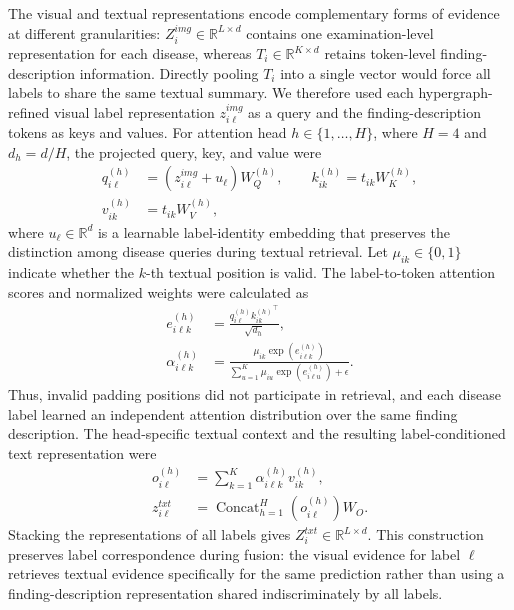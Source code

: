 \documentclass[Afour,sagev,times]{sagej}
\begin{document}
The visual and textual representations encode complementary forms of evidence at different granularities: $Z_i^{img}\in\mathbb{R}^{L\times d}$ contains one examination-level representation for each disease, whereas $T_i\in\mathbb{R}^{K\times d}$ retains token-level finding-description information. Directly pooling $T_i$ into a single vector would force all labels to share the same textual summary. We therefore used each hypergraph-refined visual label representation $z_{i\ell}^{img}$ as a query and the finding-description tokens as keys and values. For attention head $h\in\{1,\ldots,H\}$, where $H=4$ and $d_h=d/H$, the projected query, key, and value were
\begin{equation}
\begin{aligned}
q_{i\ell}^{(h)}&=(z_{i\ell}^{img}+u_{\ell})W_Q^{(h)},\qquad
k_{ik}^{(h)}=t_{ik}W_K^{(h)},\\
v_{ik}^{(h)}&=t_{ik}W_V^{(h)},
\end{aligned}
\end{equation}
where $u_{\ell}\in\mathbb{R}^{d}$ is a learnable label-identity embedding that preserves the distinction among disease queries during textual retrieval.
Let $\mu_{ik}\in\{0,1\}$ indicate whether the $k$-th textual position is valid. The label-to-token attention scores and normalized weights were calculated as
\begin{equation}
\begin{aligned}
e_{i\ell k}^{(h)}&=\frac{q_{i\ell}^{(h)}{k_{ik}^{(h)}}^{\top}}{\sqrt{d_h}},\\
\alpha_{i\ell k}^{(h)}&=
\frac{\mu_{ik}\exp(e_{i\ell k}^{(h)})}
{\sum_{u=1}^{K}\mu_{iu}\exp(e_{i\ell u}^{(h)})+\epsilon}.
\end{aligned}
\end{equation}
Thus, invalid padding positions did not participate in retrieval, and each disease label learned an independent attention distribution over the same finding description. The head-specific textual context and the resulting label-conditioned text representation were
\begin{equation}
\begin{aligned}
o_{i\ell}^{(h)}&=\sum_{k=1}^{K}\alpha_{i\ell k}^{(h)}v_{ik}^{(h)},\\
z_{i\ell}^{txt}&=\operatorname{Concat}_{h=1}^{H}\!\left(o_{i\ell}^{(h)}\right)W_O.
\end{aligned}
\end{equation}
Stacking the representations of all labels gives $Z_i^{txt}\in\mathbb{R}^{L\times d}$. This construction preserves label correspondence during fusion: the visual evidence for label $\ell$ retrieves textual evidence specifically for the same prediction rather than using a finding-description representation shared indiscriminately by all labels.
\end{document}
